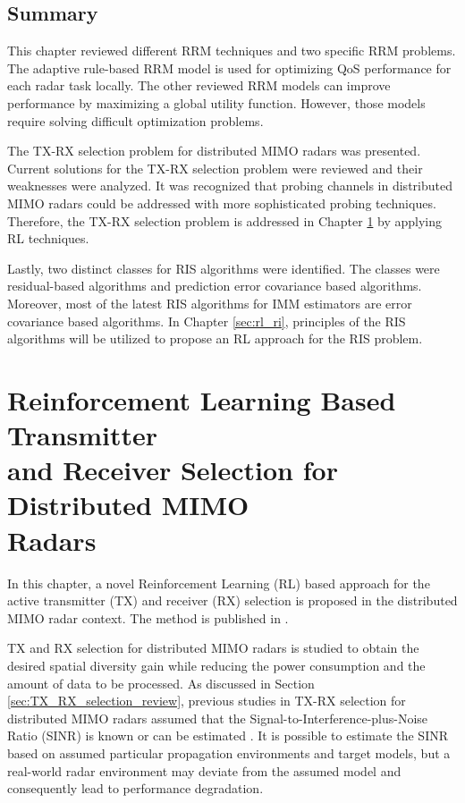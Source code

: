 \documentclass[english, 12pt, a4paper, elec, utf8, a-1b, online]{aaltothesis}
\numberwithin{equation}{section}
\begin{document}
\subsection{Summary}

This chapter reviewed different RRM techniques and two specific RRM problems.
The adaptive rule-based RRM model is used for optimizing QoS performance for each radar task locally.
The other reviewed RRM models can improve performance by maximizing a global utility function.
However, those models require solving difficult optimization problems.

The TX-RX selection problem for distributed MIMO radars was presented.
Current solutions for the TX-RX selection problem were reviewed and their weaknesses were analyzed.
It was recognized that probing channels in distributed MIMO radars could be addressed with more sophisticated probing techniques.
Therefore, the TX-RX selection problem is addressed in Chapter \ref{sec:RL_TX_RX} by applying RL techniques.

Lastly, two distinct classes for RIS algorithms were identified. 
The classes were residual-based algorithms and prediction error covariance based algorithms.
Moreover, most of the latest RIS algorithms for IMM estimators are error covariance based algorithms.
In Chapter \ref{sec:rl_ri}, principles of the RIS algorithms will be utilized to propose an RL approach for the RIS problem.


\newpage
\section[Reinforcement Learning Based Transmitter and Receiver Selection for Distributed MIMO Radars]{Reinforcement Learning Based Transmitter \\
and Receiver Selection for Distributed MIMO \\ Radars}\label{sec:RL_TX_RX}

In this chapter, a novel Reinforcement Learning (RL) based approach for the active transmitter (TX) and receiver (RX) selection is proposed in the distributed MIMO radar context.
The method is published in \cite{Pulkkinen2020}.

TX and RX selection for distributed MIMO radars is studied to obtain the desired spatial diversity gain while reducing the power consumption and the amount of data to be processed.
As discussed in Section \ref{sec:TX_RX_selection_review}, previous studies in TX-RX selection for distributed MIMO radars assumed that the Signal-to-Interference-plus-Noise Ratio (SINR) is known \cite{Sun2014} or can be estimated \cite{Godrich2011a, Godrich2011}.
It is possible to estimate the SINR based on assumed particular propagation environments and target models, but a real-world radar environment may deviate from the assumed model and consequently lead to performance degradation.
\end{document}
